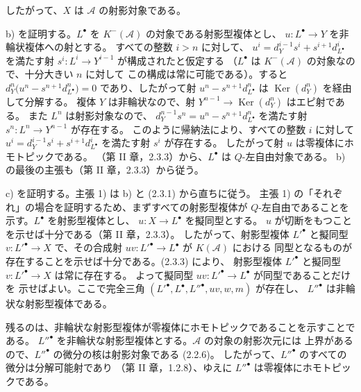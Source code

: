 \clearpage
{}%
\begingroup\small\setlength{\parskip}{0pt}\setlength{\emergencystretch}{1.5em}
\setlength{\abovedisplayskip}{4pt plus 2pt minus 2pt}%
\setlength{\belowdisplayskip}{4pt plus 2pt minus 2pt}%

したがって、$X$ は $\mathcal A$ の射影対象である。

b) を証明する。$L^\bullet$ を $K^{-}(\mathcal A)$ の対象である射影型複体とし、
$u\colon L^\bullet\longrightarrow Y$ を非輪状複体への射とする。
すべての整数 $i>n$ に対して、
$u^i=d_Y^{i-1}s^i+s^{i+1}d_{L^\bullet}^{i}$ を満たす射
$s^i\colon L^i\longrightarrow Y^{i-1}$ が構成されたと仮定する
（$L^\bullet$ は $K^{-}(\mathcal A)$ の対象なので、十分大きい $n$ に対して
この構成は常に可能である）。すると
$d_Y^n\bigl(u^n-s^{n+1}d_{L^\bullet}^{n}\bigr)=0$ であり、したがって射
$u^n-s^{n+1}d_{L^\bullet}^{n}$ は $\operatorname{Ker}(d_Y^n)$ を経由して分解する。
複体 $Y$ は非輪状なので、射
$Y^{n-1}\longrightarrow\operatorname{Ker}(d_Y^n)$ はエピ射である。
また $L^n$ は射影対象なので、
$d_Y^{n-1}s^n=u^n-s^{n+1}d_{L^\bullet}^{n}$ を満たす射
$s^n\colon L^n\longrightarrow Y^{n-1}$ が存在する。
このように帰納法により、すべての整数 $i$ に対して
$u^i=d_Y^{i-1}s^i+s^{i+1}d_{L^\bullet}^{i}$ を満たす射 $s^i$ が存在する。
したがって射 $u$ は零複体にホモトピックである。
（第 II 章，2.3.3）から、$L^\bullet$ は $Q$-左自由対象である。
b) の最後の主張も（第 II 章，2.3.3）から従う。

c) を証明する。主張 1) は b) と (2.3.1) から直ちに従う。
主張 1) の「それぞれ」の場合を証明するため、まずすべての射影型複体が
$Q$-左自由であることを示す。$L^\bullet$ を射影型複体とし、
$u\colon X\longrightarrow L^\bullet$ を擬同型とする。
$u$ が切断をもつことを示せば十分である（第 II 章，2.3.3）。
したがって、射影型複体 ${L'}^\bullet$ と擬同型
$v\colon {L'}^\bullet\longrightarrow X$ で、その合成射
$uv\colon {L'}^\bullet\longrightarrow L^\bullet$ が $K(\mathcal A)$ における
同型となるものが存在することを示せば十分である。(2.3.3) により、
射影型複体 ${L'}^\bullet$ と擬同型
$v\colon {L'}^\bullet\longrightarrow X$ は常に存在する。
よって擬同型 $uv\colon {L'}^\bullet\longrightarrow L^\bullet$ が同型であることだけを
示せばよい。ここで完全三角
$({L'}^\bullet,L^\bullet,{L''}^\bullet,uv,w,m)$ が存在し、
${L''}^\bullet$ は非輪状な射影型複体である。

残るのは、非輪状な射影型複体が零複体にホモトピックであることを示すことである。
${L''}^\bullet$ を非輪状な射影型複体とする。$\mathcal A$ の対象の射影次元には
上界があるので、${L''}^\bullet$ の微分の核は射影対象である (2.2.6)。
したがって、${L''}^\bullet$ のすべての微分は分解可能射であり
（第 II 章，1.2.8）、ゆえに ${L''}^\bullet$ は零複体にホモトピックである。

